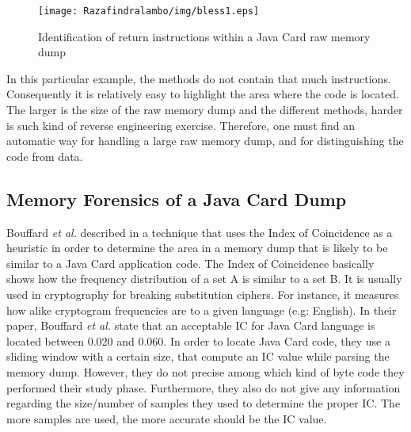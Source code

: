 \begin{figure}[!h]
\center
    \texttt{[image: Razafindralambo/img/bless1.eps]}
    \caption{Identification of return instructions within a Java Card raw memory dump}
    \label{fig:bless1}
\end{figure}

In this particular example, the methods do not contain that much instructions. Consequently it is relatively easy to highlight the area where the code is located. The larger is the size of the raw memory dump and the different methods, harder is such kind of reverse engineering exercise. Therefore, one must find an automatic way for handling a large raw memory dump, and for distinguishing the code from data. 

\subsection{Memory Forensics of a Java Card Dump}
\label{subsection:memforensics}
Bouffard \textit{et al.} described in \cite{conf/cardis/LanetBLCMMF14} a technique that
 uses the Index of Coincidence as a heuristic in order to determine the area in a memory dump that
 is likely to be similar to a Java Card application code.
 The Index of Coincidence basically shows how the frequency distribution of a set A is similar to a
 set B. It is usually used in cryptography for breaking substitution ciphers. For instance, it
 measures how alike cryptogram frequencies are to a given language (e.g: English). In their paper,
 Bouffard \textit{et al.}  state that an acceptable IC for Java Card language is located between
 0.020 and 0.060.  In order to locate Java Card code, they use a sliding window with a certain size,
 that compute an IC value while parsing the memory dump.
However, they do not precise among which kind of byte code they performed their study phase.
Furthermore, they also do not give any information regarding the size/number of samples they used to
determine the proper IC. The more samples are used, the more accurate should be the IC value.



